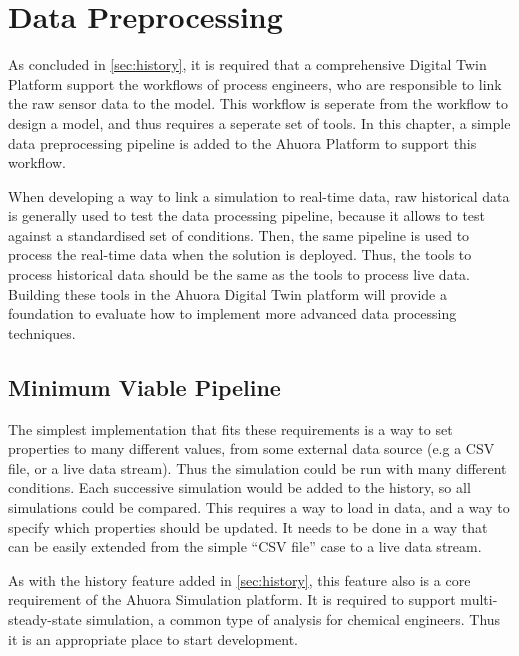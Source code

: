 \chapter{Data Preprocessing} \label{sec:datapreprocessing}


As concluded in \cref{sec:history}, it is required that a comprehensive Digital Twin Platform support the workflows of process engineers, who are responsible to link the raw sensor data to the model. This workflow is seperate from the workflow to design a model, and thus requires a seperate set of tools. 
In this chapter, a simple data preprocessing pipeline is added to the Ahuora Platform to support this workflow. 

When developing a way to link a simulation to real-time data, raw historical data is generally used to test the data processing pipeline, because it allows to test against a standardised set of conditions. Then, the same pipeline is used to process the real-time data when the solution is deployed.
Thus, the tools to process historical data should be the same as the tools to process live data. Building these tools in the Ahuora Digital Twin platform will provide a foundation to evaluate how to implement more advanced data processing techniques.

\section{Minimum Viable Pipeline}

The simplest implementation that fits these requirements is a way to set properties to many different values, from some external data source (e.g a CSV file, or a live data stream). Thus the simulation could be run with many different conditions. Each successive simulation would be added to the history, so all simulations could be compared.
This requires a way to load in data, and a way to specify which properties should be updated. It needs to be done in a way that can be easily extended from the simple ``CSV file'' case to a live data stream.

As with the history feature added in \cref{sec:history}, this feature also is a core requirement of the Ahuora Simulation platform. It is required to support multi-steady-state simulation, a common type of analysis for chemical engineers. Thus it is an appropriate place to start development. 

